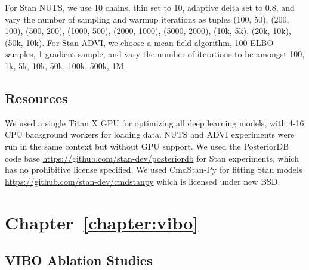 For Stan NUTS, we use 10 chains, thin set to 10, adaptive delta set to 0.8, and vary the number of sampling and warmup iterations as tuples (100, 50), (200, 100), (500, 200), (1000, 500), (2000, 1000), (5000, 2000), (10k, 5k), (20k, 10k), (50k, 10k). For Stan ADVI, we choose a mean field algorithm, 100 ELBO samples, 1 gradient sample, and vary the number of iterations to be amongst 100, 1k, 5k, 10k, 50k, 100k, 500k, 1M.

\subsection{Resources}

We used a single Titan X GPU for optimizing all deep learning models, with 4-16 CPU background workers for loading data. NUTS and ADVI experiments were run in the same context but without GPU support. We used the PosteriorDB code base \url{https://github.com/stan-dev/posteriordb} for Stan experiments, which has no prohibitive license specified. We used CmdStan-Py for fitting Stan models \url{https://github.com/stan-dev/cmdstanpy} which is licensed under new BSD.

\section{Chapter~\ref{chapter:vibo}}
\label{sec:app:vibo}

\subsection{VIBO Ablation Studies} 

